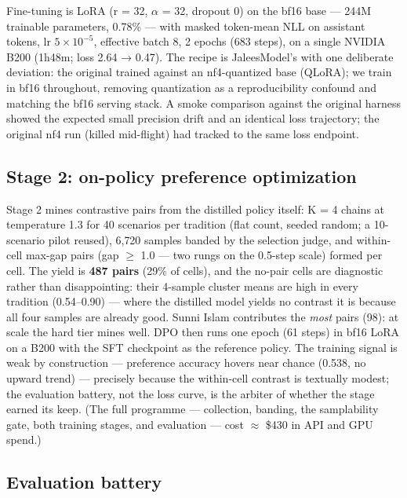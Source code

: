 \documentclass[11pt]{article}
\begin{document}
Fine-tuning is LoRA (r = 32, $\alpha$ = 32, dropout 0) on the bf16 base ---
244M trainable parameters, 0.78\% --- with masked token-mean NLL on
assistant tokens, lr $5\times10^{-5}$, effective batch 8, 2 epochs (683
steps), on a single NVIDIA B200 (1h48m; loss 2.64 → 0.47). The recipe is
JaleesModel's with one deliberate deviation: the original trained against
an nf4-quantized base (QLoRA); we train in bf16 throughout, removing
quantization as a reproducibility confound and matching the bf16 serving
stack. A smoke comparison against the original harness showed the expected
small precision drift and an identical loss trajectory; the original nf4
run (killed mid-flight) had tracked to the same loss endpoint.

\subsection{Stage 2: on-policy preference optimization}\label{sec:dpo}

Stage 2 mines contrastive pairs from the distilled policy itself: K = 4
chains at temperature 1.3 for 40 scenarios per tradition (flat count,
seeded random; a 10-scenario pilot reused), 6{,}720 samples banded by the
selection judge, and within-cell max-gap pairs (gap $\ge$ 1.0 --- two
rungs on the 0.5-step scale) formed per cell. The yield is \textbf{487
pairs} (29\% of cells), and the no-pair cells are diagnostic rather than
disappointing: their 4-sample cluster means are high in every tradition
(0.54--0.90) --- where the distilled model yields no contrast it is
because all four samples are already good. Sunni Islam contributes the
\emph{most} pairs (98): at scale the hard tier mines well. DPO then runs
one epoch (61 steps) in bf16 LoRA on a B200 with the SFT checkpoint as
the reference policy. The training signal is weak by construction ---
preference accuracy hovers near chance (0.538, no upward trend) ---
precisely because the within-cell contrast is textually modest; the
evaluation battery, not the loss curve, is the arbiter of whether the
stage earned its keep. (The full programme --- collection, banding, the
samplability gate, both training stages, and evaluation --- cost
$\approx$ \$430 in API and GPU spend.)

\subsection{Evaluation battery}\label{sec:evals}
\end{document}
